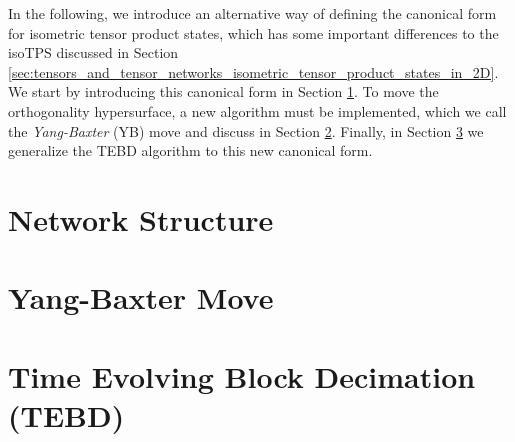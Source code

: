 In the following, we introduce an alternative way of defining the canonical form for isometric tensor product states, which has some important differences to the isoTPS discussed in Section \ref{sec:tensors_and_tensor_networks_isometric_tensor_product_states_in_2D}. We start by introducing this canonical form in Section \ref{sec:YB_isoTPS_network_structure}. To move the orthogonality hypersurface, a new algorithm must be implemented, which we call the \textit{Yang-Baxter} (YB) move and discuss in Section \ref{sec:YB_isoTPS_yang_baxter_move}. Finally, in Section \ref{sec:YB_isoTPS_TEBD} we generalize the TEBD algorithm to this new canonical form.

\section{Network Structure}
\label{sec:YB_isoTPS_network_structure}


\section{Yang-Baxter Move}
\label{sec:YB_isoTPS_yang_baxter_move}


\section{Time Evolving Block Decimation (TEBD)}
\label{sec:YB_isoTPS_TEBD}
